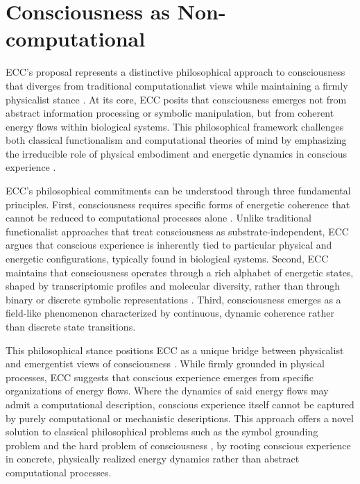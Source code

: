 \section{Consciousness as Non-computational}

ECC's proposal represents a distinctive philosophical approach to consciousness that diverges from traditional computationalist views while maintaining a firmly physicalist stance \cite{piccinini2020neurocognitive}. At its core, ECC posits that consciousness emerges not from abstract information processing or symbolic manipulation, but from coherent energy flows within biological systems. This philosophical framework challenges both classical functionalism and computational theories of mind by emphasizing the irreducible role of physical embodiment and energetic dynamics in conscious experience \cite{thompson2001radical}.

ECC's philosophical commitments can be understood through three fundamental principles. First, consciousness requires specific forms of energetic coherence that cannot be reduced to computational processes alone \cite{van1995might}. Unlike traditional functionalist approaches that treat consciousness as substrate-independent, ECC argues that conscious experience is inherently tied to particular physical and energetic configurations, typically found in biological systems. Second, ECC maintains that consciousness operates through a rich alphabet of energetic states, shaped by transcriptomic profiles and molecular diversity, rather than through binary or discrete symbolic representations \cite{wheeler2005reconstructing}. Third, consciousness emerges as a field-like phenomenon characterized by continuous, dynamic coherence rather than discrete state transitions.

This philosophical stance positions ECC as a unique bridge between physicalist and emergentist views of consciousness \cite{jonas2001phenomenon}. While firmly grounded in physical processes, ECC suggests that conscious experience emerges from specific organizations of energy flows. Where the dynamics of said energy flows may admit a computational description, conscious experience itself cannot be captured by purely computational or mechanistic descriptions. This approach offers a novel solution to classical philosophical problems such as the symbol grounding problem \cite{harnad1990symbol} and the hard problem of consciousness \cite{chalmers1997conscious}, by rooting conscious experience in concrete, physically realized energy dynamics rather than abstract computational processes.

